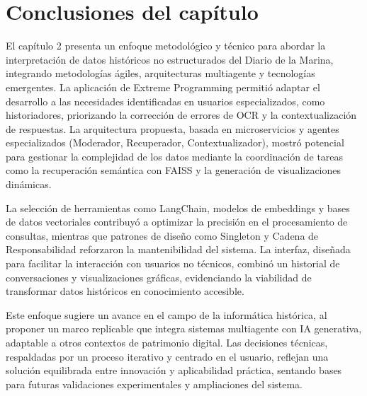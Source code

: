 \section*{Conclusiones del capítulo}

El capítulo 2 presenta un enfoque metodológico y técnico para abordar la interpretación de datos históricos no estructurados del Diario de la Marina, integrando metodologías ágiles, arquitecturas multiagente y tecnologías emergentes. La aplicación de Extreme Programming permitió adaptar el desarrollo a las necesidades identificadas en usuarios especializados, como historiadores, priorizando la corrección de errores de OCR y la contextualización de respuestas. La arquitectura propuesta, basada en microservicios y agentes especializados (Moderador, Recuperador, Contextualizador), mostró potencial para gestionar la complejidad de los datos mediante la coordinación de tareas como la recuperación semántica con FAISS y la generación de visualizaciones dinámicas.

La selección de herramientas como LangChain, modelos de embeddings y bases de datos vectoriales contribuyó a optimizar la precisión en el procesamiento de consultas, mientras que patrones de diseño como Singleton y Cadena de Responsabilidad reforzaron la mantenibilidad del sistema. La interfaz, diseñada para facilitar la interacción con usuarios no técnicos, combinó un historial de conversaciones y visualizaciones gráficas, evidenciando la viabilidad de transformar datos históricos en conocimiento accesible.

Este enfoque sugiere un avance en el campo de la informática histórica, al proponer un marco replicable que integra sistemas multiagente con IA generativa, adaptable a otros contextos de patrimonio digital. Las decisiones técnicas, respaldadas por un proceso iterativo y centrado en el usuario, reflejan una solución equilibrada entre innovación y aplicabilidad práctica, sentando bases para futuras validaciones experimentales y ampliaciones del sistema.
